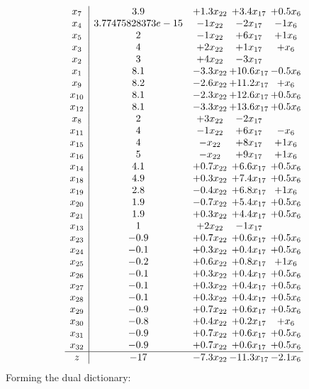 \documentclass[11pt]{article}
\begin{document}
\[\begin{array}{c| c c@{\hskip 2pt} c@{\hskip 2pt} c@{\hskip 2pt} }
 x_{7}   &  3.9 & + 1.3 x_{22} & + 3.4 x_{17} & + 0.5 x_{6}\\
 x_{4}   &  3.77475828373e-15 & -1 x_{22} & -2 x_{17} & -1 x_{6}\\
 x_{5}   &  2 & -1 x_{22} & + 6 x_{17} & + 1 x_{6}\\
 x_{3}   &  4 & + 2 x_{22} & + 1 x_{17} & +  x_{6}\\
 x_{2}   &  3 & + 4 x_{22} & -3 x_{17} &   \\
 x_{1}   &  8.1 & -3.3 x_{22} & + 10.6 x_{17} & -0.5 x_{6}\\
 x_{9}   &  8.2 & -2.6 x_{22} & + 11.2 x_{17} & +  x_{6}\\
 x_{10}   &  8.1 & -2.3 x_{22} & + 12.6 x_{17} & + 0.5 x_{6}\\
 x_{12}   &  8.1 & -3.3 x_{22} & + 13.6 x_{17} & + 0.5 x_{6}\\
 x_{8}   &  2 & + 3 x_{22} & -2 x_{17} &   \\
 x_{11}   &  4 & -1 x_{22} & + 6 x_{17} & - x_{6}\\
 x_{15}   &  4 & - x_{22} & + 8 x_{17} & + 1 x_{6}\\
 x_{16}   &  5 & - x_{22} & + 9 x_{17} & + 1 x_{6}\\
 x_{14}   &  4.1 & + 0.7 x_{22} & + 6.6 x_{17} & + 0.5 x_{6}\\
 x_{18}   &  4.9 & + 0.3 x_{22} & + 7.4 x_{17} & + 0.5 x_{6}\\
 x_{19}   &  2.8 & -0.4 x_{22} & + 6.8 x_{17} & + 1 x_{6}\\
 x_{20}   &  1.9 & -0.7 x_{22} & + 5.4 x_{17} & + 0.5 x_{6}\\
 x_{21}   &  1.9 & + 0.3 x_{22} & + 4.4 x_{17} & + 0.5 x_{6}\\
 x_{13}   &  1 & + 2 x_{22} & -1 x_{17} &   \\
 x_{23}   &  -0.9 & + 0.7 x_{22} & + 0.6 x_{17} & + 0.5 x_{6}\\
 x_{24}   &  -0.1 & + 0.3 x_{22} & + 0.4 x_{17} & + 0.5 x_{6}\\
 x_{25}   &  -0.2 & + 0.6 x_{22} & + 0.8 x_{17} & + 1 x_{6}\\
 x_{26}   &  -0.1 & + 0.3 x_{22} & + 0.4 x_{17} & + 0.5 x_{6}\\
 x_{27}   &  -0.1 & + 0.3 x_{22} & + 0.4 x_{17} & + 0.5 x_{6}\\
 x_{28}   &  -0.1 & + 0.3 x_{22} & + 0.4 x_{17} & + 0.5 x_{6}\\
 x_{29}   &  -0.9 & + 0.7 x_{22} & + 0.6 x_{17} & + 0.5 x_{6}\\
 x_{30}   &  -0.8 & + 0.4 x_{22} & + 0.2 x_{17} & +  x_{6}\\
 x_{31}   &  -0.9 & + 0.7 x_{22} & + 0.6 x_{17} & + 0.5 x_{6}\\
 x_{32}   &  -0.9 & + 0.7 x_{22} & + 0.6 x_{17} & + 0.5 x_{6}\\
\hline
z    &  -17 & -7.3 x_{22} & -11.3 x_{17} & -2.1 x_{6}\\
\end{array}\]
Forming the dual dictionary:
\end{document}
